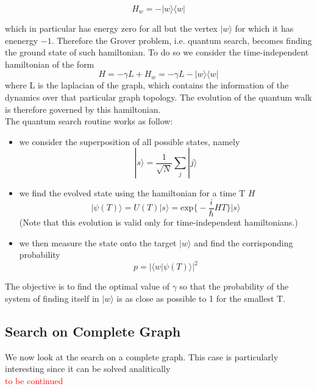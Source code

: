 \documentclass[aps,pra,reprint, onecolumn]{revtex4-2}
\newcommand{\red}[1]{\textcolor{red}{#1}}
\begin{document}
\begin{equation}
  H_w = -|w\rangle\langle w|
\end{equation}

which in particular has energy zero for all but the vertex $|w\rangle$ for which it has enenergy $-1$. Therefore the Grover problem, i.e. quantum search, becomes finding the ground state of such hamiltonian. To do so we consider the time-independent hamiltonian of the form
\begin{equation}
  H = -\gamma L + H_w = -\gamma L -|w\rangle\langle w|
\end{equation}
where L is the laplacian of the graph, which contains the information of the dynamics over that particular graph topology. The evolution of the quantum walk is therefore governed by this hamiltonian.\\

The quantum search routine works as follow:
\begin{itemize}
  \item we consider the superposition of all possible states, namely
  \begin{equation}
    |s\rangle = \frac{1}{\sqrt{N}}\sum_j|j\rangle
  \end{equation}

  \item we find the evolved state using the hamiltonian for a time T $H$
  \begin{equation}
  |\psi(T)\rangle = U(T)|s\rangle  = \mbox{exp}\Big\{-\frac{i}{\hbar}HT\big\}|s\rangle
  \end{equation}
  (Note that this evolution is valid only for time-independent hamiltonians.)

  \item we then measure the state onto the target $|w\rangle$ and find the corrisponding probability
  \begin{equation}
    p = |\langle w|\psi(T)\rangle|^2
  \end{equation}

\end{itemize}

The objective is to find the optimal value of $\gamma$ so that the probability of the system of finding itself in $|w\rangle$ is as close as possible to 1 for the smallest T.

\subsection{Search on Complete Graph}
We now look at the search on a complete graph. This case is particularly interesting since it can be solved analitically\\
\red{to be continued}
\end{document}
